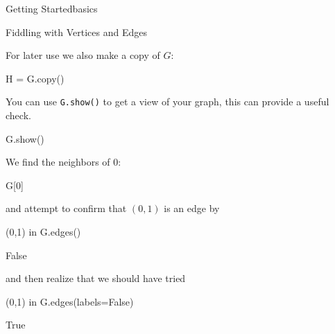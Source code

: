 \begin{chap}{Getting Started}{basics}
\begin{sect}{Fiddling with Vertices and Edges}
\begin{sagecode}
\end{sagecode}
%
\begin{para}
For later use we also make a copy of $G$:
\end{para}
%
\begin{sagecode}
\begin{sageinput}
H = G.copy()
\end{sageinput}
\begin{sageoutput}
\end{sageoutput}
\end{sagecode}
%
\begin{para}
You can use \verb|G.show()| to get a view of your graph, this can provide
a useful check.
\end{para}
%
%
\begin{sagecode}
\begin{sageinput}
G.show()
\end{sageinput}
\begin{sageoutput}
\end{sageoutput}
\end{sagecode}
%
\begin{para}
We find the neighbors of 0:
\end{para}
%
\begin{sagecode}
\begin{sageinput}
G[0]
\end{sageinput}
\begin{sageoutput}
[8, 1, 2, 7]
\end{sageoutput}
\end{sagecode}
%
\begin{para}    
and attempt to confirm that $(0,1)$ is an edge by
\end{para}
%
\begin{sagecode}
\begin{sageinput}
(0,1) in G.edges()
\end{sageinput}
\begin{sageoutput}
False
\end{sageoutput}
\end{sagecode}
%
\begin{para}
and then realize that we should have tried
\end{para}
%
%
\begin{sagecode}
\begin{sageinput}
(0,1) in G.edges(labels=False)
\end{sageinput}
\begin{sageoutput}
True
\end{sageoutput}

\end{sagecode}
\end{sect}
\end{chap}
